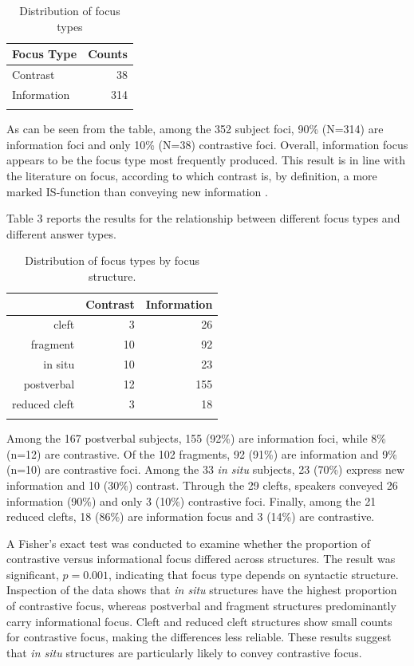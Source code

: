 \begin{table} 
\centering
\begin{tabular}{lr}
  \lsptoprule
Focus Type & Counts \\ 
  \midrule
 {Contrast} &  38 \\
 {Information} & 314 \\
   \lspbottomrule
\end{tabular}
\label{tab:distribution of focus types}
\caption{Distribution of focus types}
\end{table}



As can be seen from the table, among the 352 subject foci, 90\% (N=314) are information foci and only 10\% (N=38) contrastive foci. Overall, information focus appears to be the focus type most frequently produced. This result is in line with the literature on focus, according to which contrast is, by definition, a more marked IS-function than conveying new information \parencite{zimmermann2008contrastive, skopeteas2010focus}. 

Table 3 reports the results for the relationship between different focus types and different answer types.

\begin{table}[ht]
\centering
\begin{tabular}{rrr}
  \lsptoprule
 & \textbf{Contrast} & \textbf{Information} \\ 
  \midrule
cleft &   3 &  26 \\ 
  fragment &  10 &  92 \\ 
  in situ &  10 &  23 \\ 
  postverbal &  12 & 155 \\ 
  reduced cleft &   3 &  18 \\ 
   \lspbottomrule
\end{tabular}
\caption{Distribution of focus types by focus structure.}
\end{table}


 Among the 167 postverbal subjects, 155 (92\%) are information foci, while 8\% (n=12) are contrastive. Of the 102 fragments, 92 (91\%) are information and 9\% (n=10) are contrastive foci. Among the 33 \textit{in situ} subjects, 23 (70\%) express new information and 10 (30\%) contrast. Through the 29 clefts, speakers conveyed 26 information (90\%) and only 3 (10\%) contrastive foci. Finally, among the 21 reduced clefts, 18 (86\%) are information focus and 3 (14\%) are contrastive.
 
 A Fisher's exact test was conducted to examine whether the proportion of contrastive versus informational focus differed across structures. The result was significant, $p = 0.001$, indicating that focus type depends on syntactic structure. Inspection of the data shows that \textit{in situ} structures have the highest proportion of contrastive focus, whereas postverbal and fragment structures predominantly carry informational focus. Cleft and reduced cleft structures show small counts for contrastive focus, making the differences less reliable. These results suggest that \textit{in situ} structures are particularly likely to convey contrastive focus.


